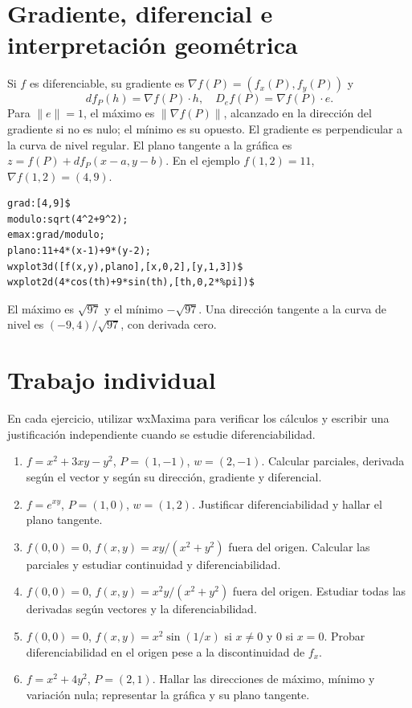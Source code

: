 \documentclass[12pt,a4paper]{article}
\begin{document}
\section{Gradiente, diferencial e interpretación geométrica}
Si $f$ es diferenciable, su gradiente es $\nabla f(P)=(f_x(P),f_y(P))$ y
\[\boxed{df_P(h)=\nabla f(P)\cdot h,\quad D_ef(P)=\nabla f(P)\cdot e}.\]
Para $\|e\|=1$, el máximo es $\|\nabla f(P)\|$, alcanzado en la dirección del gradiente si no es nulo; el mínimo es su opuesto. El gradiente es perpendicular a la curva de nivel regular. El plano tangente a la gráfica es $z=f(P)+df_P(x-a,y-b)$.
En el ejemplo $f(1,2)=11$, $\nabla f(1,2)=(4,9)$.
\begin{lstlisting}
grad:[4,9]$
modulo:sqrt(4^2+9^2);
emax:grad/modulo;
plano:11+4*(x-1)+9*(y-2);
wxplot3d([f(x,y),plano],[x,0,2],[y,1,3])$
wxplot2d(4*cos(th)+9*sin(th),[th,0,2*%pi])$
\end{lstlisting}
El máximo es $\sqrt{97}$ y el mínimo $-\sqrt{97}$. Una dirección tangente a la curva de nivel es $(-9,4)/\sqrt{97}$, con derivada cero.
\section{Trabajo individual}
En cada ejercicio, utilizar wxMaxima para verificar los cálculos y escribir una justificación independiente cuando se estudie diferenciabilidad.
\begin{enumerate}
\item $f=x^2+3xy-y^2$, $P=(1,-1)$, $w=(2,-1)$. Calcular parciales, derivada según el vector y según su dirección, gradiente y diferencial.
\item $f=e^{xy}$, $P=(1,0)$, $w=(1,2)$. Justificar diferenciabilidad y hallar el plano tangente.
\item $f(0,0)=0$, $f(x,y)=xy/(x^2+y^2)$ fuera del origen. Calcular las parciales y estudiar continuidad y diferenciabilidad.
\item $f(0,0)=0$, $f(x,y)=x^2y/(x^2+y^2)$ fuera del origen. Estudiar todas las derivadas según vectores y la diferenciabilidad.
\item $f(0,0)=0$, $f(x,y)=x^2\sin(1/x)$ si $x\ne0$ y $0$ si $x=0$. Probar diferenciabilidad en el origen pese a la discontinuidad de $f_x$.
\item $f=x^2+4y^2$, $P=(2,1)$. Hallar las direcciones de máximo, mínimo y variación nula; representar la gráfica y su plano tangente.
\end{enumerate}
\end{document}
